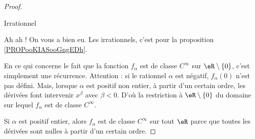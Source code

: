\begin{proof}
\begin{subproof}
        \item[Irrationnel]

            Ah ah ! On vous a bien eu. Les irrationnels, c'est pour la proposition \ref{PROPooKIASooGngEDh}.
    \end{subproof}
    En ce qui concerne le fait que la fonction \( f_{\alpha}\) est de classe \(  C^{\infty}\) sur \( \eR\setminus\{ 0 \}\), c'est simplement une récurrence. Attention : si le rationnel \( \alpha\) est négatif, \( f_{\alpha}(0)\) n'est pas défini. Mais, lorsque \( \alpha\) est positif non entier, à partir d'un certain ordre, les dérivées font intervenir \( x^{\beta}\) avec \( \beta<0\). D'où la restriction à \( \eR\setminus\{ 0 \}\) du domaine sur lequel \( f_{\alpha}\) est de classe \(  C^{\infty}\).

    Si \( \alpha\) est positif entier, alors \( f_{\alpha}\) est de classe \(  C^{\infty}\) sur tout \( \eR\) parce que toutes les dérivées sont nulles à partir d'un certain ordre.
\end{proof}


